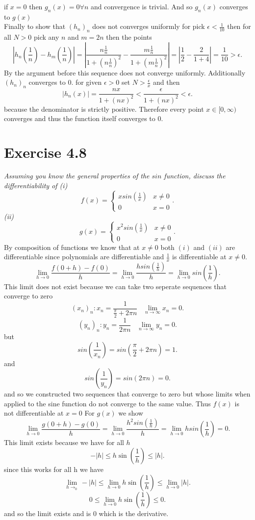 \documentclass{amsart}
\begin{document}
    if $x = 0$ then $g_n(x) = 0 \forall n$ and convergence is trivial.
    And so $g_n(x)$ converges to $g(x)$
    \\
    Finally to show that $(h_n)_n$ does not converges uniformly for pick $\epsilon < \frac{1}{10}$ then for all $N > 0$ pick any $n$ and  $m = 2n$
    then the points
    \[
    |h_n(\frac{1}{n}) - h_m(\frac{1}{n})| = |\frac{n \frac{1}{n}}{1 + (n \frac{1}{n})^2} - \frac{m \frac{1}{n}}{1 + (m \frac{1}{n})^2}| = |\frac{1}{2} - \frac{2}{1+4}| = \frac{1}{10} > \epsilon
    .\] 
    By the argument before this sequence does not converge uniformly.
    Additionally $(h_n)_n$ converges to  $0$.  for given $\epsilon > 0$ set $ N > \frac{\epsilon}{x}$ and then
    \[
    |h_n(x)| = \frac{nx}{1+(nx)^2} < \frac{\epsilon}{1+(nx)^2} < \epsilon
    .\] 
    because the denominator is strictly positive. Therefore every point  $x \in [0, \infty)$ converges and thus the function itself converges to 0.

    \section{Exercise 4.8}
    \emph{
        Assuming you know the general properties of the $sin$ function, discuss the differentiability of
        (i)
        \[
        f(x) =
        \begin{cases}
            xsin(\frac{1}{x}) & x \ne 0\\
            0 & x = 0
        \end{cases}
        .\] 
        (ii)
        \[
        g(x) =
        \begin{cases}
            x^2sin(\frac{1}{x}) & x \ne 0\\
            0 & x = 0
        \end{cases}
        .\] 
    }
    By composition of functions we know that at $x \ne 0$ both $(i)$ and $(ii)$ are differentiable
    since polynomials are differentiable and $\frac{1}{x}$ is differentiable at $x \ne 0$.
    \[
    \lim_{h\to 0} \frac{f(0+h)-f(0)}{h} = \lim_{h\to 0}\frac{hsin(\frac{1}{h})}{h} = \lim_{h\to 0}sin(\frac{1}{h})
    .\] 
    This limit does not exist because we can take two seperate sequences that converge to zero
    \[
        (x_n)_n : x_n = \frac{1}{\frac{\pi}{2}+2\pi n} \;\;\; \lim_{n\to\infty} x_n = 0
    .\] 
    \[
        (y_n)_n : y_n = \frac{1}{2\pi n} \; \; \; \lim_{n\to\infty} y_n = 0
    .\] 
    but
    \[
    sin(\frac{1}{x_n}) = sin(\frac{\pi}{2} + 2\pi n) = 1
    .\] 
    and 
    \[
    sin(\frac{1}{y_n} )= sin(2\pi n) = 0
    .\] 
    and so we constructed two sequences that converge to zero but whose limits when applied to the sine function do not converge to the same value.
    Thus $f(x)$ is not differentiable at $x = 0$
    For  $g(x)$ we show
    \[
    \lim_{h\to 0} \frac{g(0+h) - g(0)}{h} = \lim_{h\to 0} \frac{h^2sin(\frac{1}{h})}{h} = \lim_{h\to 0} hsin(\frac{1}{h}) = 0
    .\] 
    This limit exists because we have for all $h$
    \[
    -|h| \le h\sin(\frac{1}{h}) \le  |h|
    .\] 
    since this works for all h we have
    \[
    \lim_{h\to_0} -|h| \le \lim_{h\to 0} h\sin(\frac{1}{h}) \le \lim_{h\to 0} |h|
    .\] 
    \[
    0 \le \lim_{h\to 0 } h\sin(\frac{1}{h}) \le 0
    .\] 
    and so the limit exists and is 0 which is the derivative.
\end{document}
